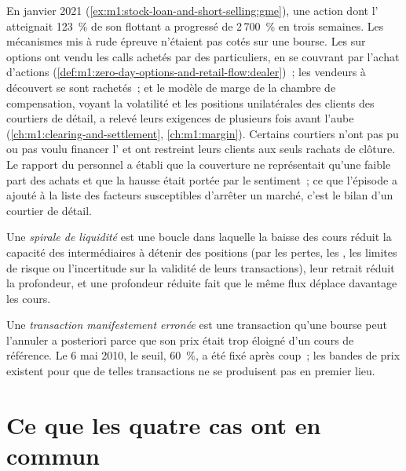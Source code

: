 En janvier 2021 (\cref{ex:m1:stock-loan-and-short-selling:gme}), une action
dont l' atteignait 123~\% de son flottant a progressé de 2\,700~\% en trois semaines. Les
mécanismes mis à rude épreuve n'étaient pas cotés sur une bourse. Les  sur options ont vendu
les calls achetés par des particuliers, en se couvrant par l'achat d'actions
(\cref{def:m1:zero-day-options-and-retail-flow:dealer})~; les vendeurs à découvert se sont rachetés~;
et le modèle de marge de la chambre de compensation, voyant la volatilité et les
positions unilatérales des clients des courtiers de détail, a relevé leurs
exigences de plusieurs fois avant l'aube (\cref{ch:m1:clearing-and-settlement}, \cref{ch:m1:margin}). Certains courtiers
n'ont pas pu ou pas voulu financer l' et ont restreint leurs clients
aux seuls rachats de clôture. Le rapport du personnel a établi que la couverture ne représentait qu'une faible part des
achats et que la hausse était portée par le sentiment~; ce que l'épisode a ajouté
à la liste des facteurs susceptibles d'arrêter un marché, c'est le bilan d'un courtier
de détail.

\begin{definition}\label{def:m1:stress-case-studies:spiral}
Une \emph{spirale de liquidité} est une boucle dans laquelle la baisse
des cours réduit la capacité des intermédiaires à détenir des positions (par
les pertes, les , les limites de risque ou l'incertitude sur la validité de leurs
transactions), leur retrait réduit la profondeur, et une profondeur réduite fait que le même
flux déplace davantage les cours.
\end{definition}

\begin{definition}\label{def:m1:stress-case-studies:erroneous}
Une \emph{transaction manifestement erronée} est une transaction qu'une
bourse peut l'annuler a posteriori parce que son prix était trop éloigné
d'un cours de référence. Le 6 mai 2010, le seuil, 60~\%, a été fixé après
coup~; les bandes de prix existent pour que de telles transactions ne se produisent
pas en premier lieu.
\end{definition}

\section{Ce que les quatre cas ont en commun}

